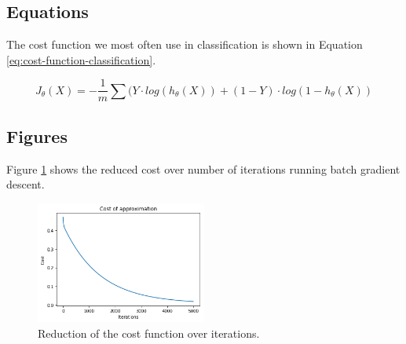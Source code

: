 \documentclass[a4paper, twocolumn]{article}
\begin{document}
\subsection{Equations\label{sec:Equations}}

The cost function we most often use in classification is shown in Equation \ref{eq:cost-function-classification}.

\begin{equation}
    \label{eq:cost-function-classification}
    J_\theta(X) = -\frac{1}{m} \sum (Y \cdot log(h_\theta(X)) + (1 - Y) \cdot log(1 - h_\theta(X))
\end{equation}


\subsection{Figures\label{sec:figures}}

Figure \ref{fig:univariate-linear-fit-cost} shows the reduced cost over number of iterations running batch gradient descent.

\begin{figure}[h]
    \centering
    \includegraphics[width=0.5\textwidth]{figures/univariate-linear-fit-cost.png}
    \caption{Reduction of the cost function over iterations.}
    \label{fig:univariate-linear-fit-cost}
\end{figure}


\printbibliography
\end{document}
